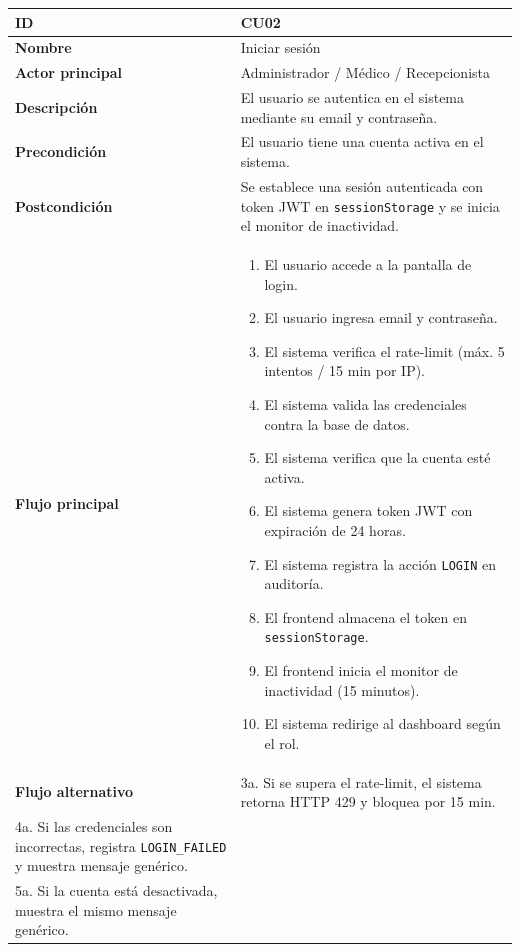 \documentclass[11pt,a4paper]{article}
\begin{document}
\begin{longtable}{|L{3.5cm}|L{10cm}|}
    \hline
    \textbf{ID}                & CU02                                                                                                                \\ \hline
    \textbf{Nombre}            & Iniciar sesión                                                                                                      \\ \hline
    \textbf{Actor principal}   & Administrador / Médico / Recepcionista                                                                              \\ \hline
    \textbf{Descripción}       & El usuario se autentica en el sistema mediante su email y contraseña.                                               \\ \hline
    \textbf{Precondición}      & El usuario tiene una cuenta activa en el sistema.                                                                   \\ \hline
    \textbf{Postcondición}     & Se establece una sesión autenticada con token JWT en \texttt{sessionStorage} y se inicia el monitor de inactividad. \\ \hline
    \textbf{Flujo principal}   &
    \begin{enumerate}
        \item El usuario accede a la pantalla de login.
        \item El usuario ingresa email y contraseña.
        \item El sistema verifica el rate-limit (máx. 5 intentos / 15 min por IP).
        \item El sistema valida las credenciales contra la base de datos.
        \item El sistema verifica que la cuenta esté activa.
        \item El sistema genera token JWT con expiración de 24 horas.
        \item El sistema registra la acción \texttt{LOGIN} en auditoría.
        \item El frontend almacena el token en \texttt{sessionStorage}.
        \item El frontend inicia el monitor de inactividad (15 minutos).
        \item El sistema redirige al dashboard según el rol.
    \end{enumerate}                                                                    \\ \hline
    \textbf{Flujo alternativo} &
    3a. Si se supera el rate-limit, el sistema retorna HTTP 429 y bloquea por 15 min.                                                                \\
    4a. Si las credenciales son incorrectas, registra \texttt{LOGIN\_FAILED} y muestra mensaje genérico.                                             \\
    5a. Si la cuenta está desactivada, muestra el mismo mensaje genérico.                                                                            \\ \hline
\end{longtable}
\end{document}
